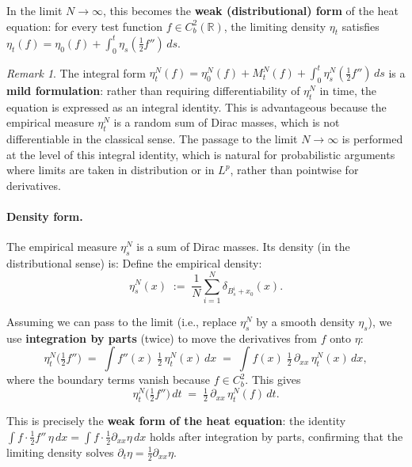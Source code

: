 \documentclass[11pt]{article}
\theoremstyle{definition}
\theoremstyle{remark}
\newtheorem{remark}{Remark}
\begin{document}
In the limit $N \to \infty$, this becomes the
\textbf{weak (distributional) form} of the heat equation:
for every test function $f \in C_b^2(\mathbb{R})$,
the limiting density $\eta_t$ satisfies
$\eta_t(f) = \eta_0(f) + \int_0^t \eta_s(\tfrac{1}{2}f'')\,ds$.

\begin{remark}
The integral form $\eta_t^N(f) = \eta_0^N(f) + M_t^N(f) + \int_0^t \eta_s^N(\tfrac{1}{2}f'')\,ds$ is a \textbf{mild formulation}: rather than requiring differentiability of $\eta_t^N$ in time, the equation is expressed as an integral identity.  This is advantageous because the empirical measure $\eta_t^N$ is a random sum of Dirac masses, which is not differentiable in the classical sense.  The passage to the limit $N \to \infty$ is performed at the level of this integral identity, which is natural for probabilistic arguments where limits are taken in distribution or in $L^p$, rather than pointwise for derivatives.
\end{remark}

\paragraph{Density form.}


The empirical measure $\eta_s^N$ is a sum of Dirac masses.
Its density (in the distributional sense) is:
Define the empirical density:
\[
    \eta_s^N(x)
    \;:=\;
    \frac{1}{N}\sum_{i=1}^{N}
    \delta_{B_s^i + x_0}(x).
\]

Assuming we can pass to the limit (i.e., replace
$\eta_s^N$ by a smooth density $\eta_s$), we use
\textbf{integration by parts} (twice) to move the
derivatives from $f$ onto $\eta$:
\[
    \eta_t^N\!\bigl(\tfrac{1}{2}f''\bigr)
    \;=\;
    \int f''(x)\;\tfrac{1}{2}\,\eta_t^N(x)\,dx
    \;=\;
    \int f(x)\;\tfrac{1}{2}\,\partial_{xx}\,\eta_t^N(x)\,dx,
\]
where the boundary terms vanish because $f \in C_b^2$.
This gives
\[
    \eta_t^N\!\bigl(\tfrac{1}{2}f''\bigr)\,dt
    \;=\;
    \tfrac{1}{2}\,\partial_{xx}\,\eta_t^N(f)\,dt.
\]

This is precisely the \textbf{weak form of the heat equation}:
the identity $\int f \cdot \tfrac{1}{2}f''\,\eta\,dx
= \int f \cdot \tfrac{1}{2}\partial_{xx}\eta\,dx$
holds after integration by parts, confirming that the
limiting density solves $\partial_t \eta = \tfrac{1}{2}\partial_{xx}\eta$.
\end{document}

